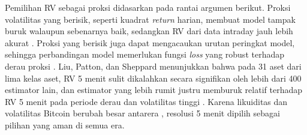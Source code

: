 Pemilihan RV sebagai proksi didasarkan pada rantai argumen berikut. Proksi
volatilitas yang berisik, seperti kuadrat \textit{return} harian, membuat model
tampak buruk walaupun sebenarnya baik, sedangkan RV dari data intraday jauh
lebih akurat \cite{andersen1998}. Proksi yang berisik juga dapat mengacaukan
urutan peringkat model, sehingga perbandingan model memerlukan fungsi
\textit{loss} yang robust terhadap derau proksi \cite{patton2011}. Liu, Patton,
dan Sheppard menunjukkan bahwa pada 31 aset dari lima kelas aset, RV 5 menit
sulit dikalahkan secara signifikan oleh lebih dari 400 estimator lain, dan
estimator yang lebih rumit justru memburuk relatif terhadap RV 5 menit pada
periode derau dan volatilitas tinggi \cite{liu2015}. Karena likuiditas dan
volatilitas Bitcoin berubah besar antarera \cite{do2026}, resolusi 5 menit
dipilih sebagai pilihan yang aman di semua era.

